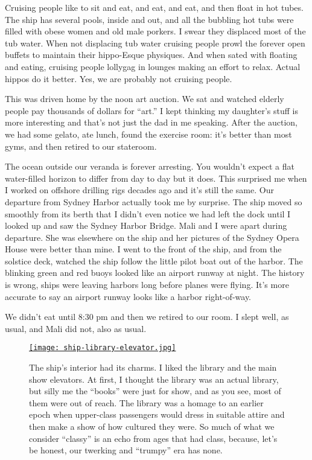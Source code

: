 Cruising people like to sit and eat, and eat, and eat, and then float in
hot tubes. The ship has several pools, inside and out, and all the
bubbling hot tubs were filled with obese women and old male porkers. I
swear they displaced most of the tub water. When not displacing tub
water cruising people prowl the forever open buffets to maintain their
hippo-Esque physiques. And when sated with floating and eating, cruising
people lollygag in lounges making an effort to relax. Actual hippos do
it better. Yes, we are probably not cruising people.

This was driven home by the noon art auction. We sat and watched elderly
people pay thousands of dollars for ``art.'' I kept thinking my
daughter's stuff is more interesting and that's not just the dad in me
speaking. After the auction, we had some gelato, ate lunch, found the
exercise room: it's better than most gyms, and then retired to our
stateroom.

The ocean outside our veranda is forever arresting. You wouldn't expect
a flat water-filled horizon to differ from day to day but it does. This
surprised me when I worked on offshore drilling rigs decades ago and
it's still the same. Our departure from Sydney Harbor actually took me
by surprise. The ship moved so smoothly from its berth that I didn't
even notice we had left the dock until I looked up and saw the Sydney
Harbor Bridge. Mali and I were apart during departure. She was elsewhere
on the ship and her pictures of the Sydney Opera House were better than
mine. I went to the front of the ship, and from the solstice deck,
watched the ship follow the little pilot boat out of the harbor. The
blinking green and red buoys looked like an airport runway at night. The
history is wrong, ships were leaving harbors long before planes were
flying. It's more accurate to say an airport runway looks like a harbor
right-of-way.

We didn't eat until 8:30 pm and then we retired to our room. I slept
well, as usual, and Mali did not, also as usual.


\captionsetup[figure]{labelformat=empty}
\begin{figure}[htbp]
\centering
\href{https://conceptcontrol.smugmug.com/Trips/Overseas/Australia-New-Zealand-2022/i-4m5CvVC/A}{\texttt{[image: ship-library-elevator.jpg]}}
\caption[Ship library and show elevator]{The ship's interior had its charms. I liked the library and the
main show elevators. At first, I thought the library was an actual
library, but silly me the ``books'' were just for show, and as you see,
most of them were out of reach. The library was a homage to an earlier
epoch when upper-class passengers would dress in suitable attire and
then make a show of how cultured they were. So much of what we consider
``classy'' is an echo from ages that had class, because, let's be
honest, our twerking and ``trumpy'' era has none.}
\label{fig:7606x1}
\end{figure}

